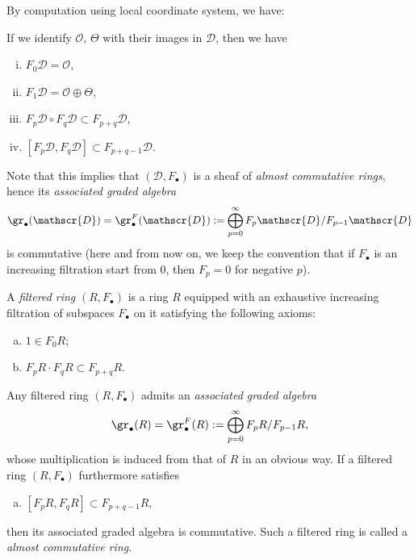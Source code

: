 By computation using local coordinate system, we have:
\begin{lem}\label{lem:filtration_of_D}
If we identify $\mathscr{O}$, $\Theta$ with their images in $\mathscr{D}$, 
then we have
\begin{enumerate}[(i)]
\item $F_0\mathscr{D}=\mathscr{O}$,
\item $F_1\mathscr{D}=\mathscr{O}\oplus\Theta$,
\item $F_p\mathscr{D}\circ F_q\mathscr{D}\subset F_{p+q}\mathscr{D}$,
\item $[F_p\mathscr{D},F_q\mathscr{D}]\subset F_{p+q-1}\mathscr{D}$.
\end{enumerate}
\end{lem}
Note that this implies that $(\mathscr{D},F_\bullet)$ is a sheaf of 
\emph{almost commutative rings}, hence its \emph{associated graded algebra}
\[
\gr_\bullet(\mathscr{D})=\gr^F_\bullet(\mathscr{D}):=
\bigoplus_{p=0}^{\infty}F_p\mathscr{D}/F_{p-1}\mathscr{D}
\]
is commutative (here and from now on, we keep the convention that 
if $F_\bullet$ is an increasing filtration start from $0$, 
then $F_p=0$ for negative $p$).

\begin{Rem}
A \emph{filtered ring} $(R,F_\bullet)$ is a ring $R$ equipped with 
an exhaustive increasing filtration of subspaces $F_\bullet$ on it 
satisfying the following axioms:
\begin{enumerate}[(a)]
\item $1\in F_0R$;
\item $F_pR\cdot F_qR\subset F_{p+q}R$.
\end{enumerate}
Any filtered ring $(R,F_\bullet)$ admits an \emph{associated graded algebra}
\[
\gr_\bullet(R)=\gr^F_\bullet(R):=
\bigoplus_{p=0}^{\infty}F_pR/F_{p-1}R,
\]
whose multiplication is induced from that of $R$ in an obvious way. 
If a filtered ring $(R,F_\bullet)$ furthermore satisfies
\begin{enumerate}[(c)]
\item $[F_pR,F_qR]\subset F_{p+q-1}R$,
\end{enumerate}
then its associated graded algebra is commutative. 
Such a filtered ring is called a \emph{almost commutative ring}.
\end{Rem}

